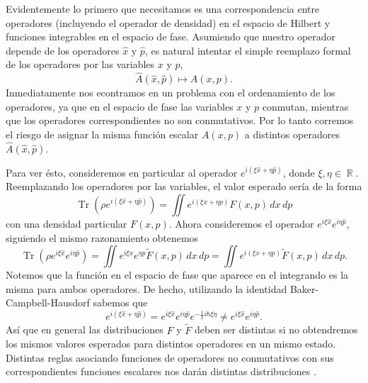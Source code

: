 \documentclass[a4paper]{report}
\DeclareMathOperator{\R}{\mathbb{R}}
\DeclareMathOperator{\Tr}{Tr}
\begin{document}
  Evidentemente lo primero que necesitamos es una
  correspondencia entre operadores (incluyendo el operador
  de densidad) en el espacio de Hilbert y funciones
  integrables en el espacio de fase. Asumiendo que nuestro
  operador depende de los operadores $\hat{x}$ y $\hat{p}$,
  es natural intentar el simple reemplazo formal de los
  operadores por las variables $x$ y $p$,
  \[
    \hat{A}(\hat{x},\hat{p})
    \mapsto 
    A(x,p).
  \] 
  Inmediatamente nos econtramos en un problema con el
  ordenamiento de los operadores, ya que en el espacio de
  fase las variables $x$ y $p$ conmutan, mientras que los
  operadores correspondientes no son conmutativos. Por lo
  tanto corremos el riesgo de asignar la misma función
  escalar $A(x,p)$ a distintos operadores
  $\hat{A}(\hat{x},\hat{p})$.

  Para ver ésto, consideremos en particular al operador
  $e^{i\left( \xi \hat{x} + \eta \hat{p} \right)}$, donde
  $\xi, \eta \in \R$. Reemplazando los operadores por las
  variables, el valor esperado sería de la forma
  \begin{equation}
    \Tr\left( \rho e^{i\left( \xi \hat{x} + \eta
    \hat{p} \right)} \right)
    = \iint e^{i\left( \xi x + \eta p \right)} F(x,p) \,
    dx \, dp
  \end{equation}
  con una densidad particular $F(x,p)$. Ahora consideremos
  el operador $e^{i\xi \hat{x}} e^{i\eta\hat{p}}$, siguiendo
  el mismo razonamiento obtenemos
  \begin{equation}
    \Tr\left(\rho e^{i\xi \hat{x}} e^{i\eta
    \hat{p}}\right)
    = \iint e^{i\xi x} e^{\eta p} \tilde F(x,p) \, dx \,
    dp
    = \iint e^{i\left( \xi x + \eta p \right)} \tilde
    F(x,p) \, dx \, dp.
  \end{equation}
  Notemos que la función en el espacio de fase que aparece
  en el integrando es la misma para ambos operadores. De
  hecho, utilizando la identidad Baker-Campbell-Hausdorf
  sabemos que
  \begin{equation}
    e^{i\left( \xi \hat{x} + \eta \hat{p} \right)}
    = e^{i\xi \hat{x}}e^{i\eta \hat{p}}e^{-\frac{1}{2}i\hbar
    \xi \eta}
    \neq e^{i\xi \hat{x}}e^{i\eta \hat{p}}.
  \end{equation}
  Así que en general las distribuciones $F$ y $\tilde F$
  deben ser distintas si no obtendremos los mismos valores
  esperados para distintos operadores en un mismo estado.
  Distintas reglas asociando funciones de operadores no
  conmutativos con sus correspondientes funciones escalares
  nos darán distintas distribuciones
  \cite{leeTheoryApplicationQuantum1995}.
\end{document}
